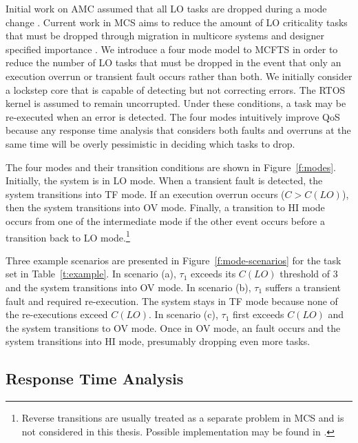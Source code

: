 	Initial work on AMC assumed that all LO tasks are dropped during a mode change \cite{baruah2011response}. 
	Current work in MCS aims to reduce the amount of LO criticality tasks that must be dropped through migration in multicore systems \cite{al2015enhanced} and designer specified importance \cite{fleming2014incorporating}. 
	We introduce a four mode model to MCFTS in order to reduce the number of LO tasks that must be dropped in the event that only an execution overrun or transient fault occurs rather than both. 
	We initially consider a lockstep core that is capable of detecting but not correcting errors.
	The RTOS kernel is assumed to remain uncorrupted.
	Under these conditions, a task may be re-executed when an error is detected.
		The four modes intuitively improve QoS because any response time analysis that considers both faults and overruns at the same time will be overly pessimistic in deciding which tasks to drop.
	
	The four modes and their transition conditions are shown in Figure~\ref{f:modes}. 
	Initially, the system is in LO mode. 
	When a transient fault is detected, the system transitions into TF mode. 
	If an execution overrun occurs ($C>C(LO)$), then the system transitions into OV mode. 
	Finally, a transition to HI mode occurs from one of the intermediate mode if the other event occurs before a transition back to LO mode.\footnote{Reverse transitions are usually treated as a separate problem in MCS and is not considered in this thesis. Possible implementation may be found in \cite{bate2015bailout}.}
	
	Three example scenarios are presented in Figure~\ref{f:mode-scenarios} for the task set in Table~\ref{t:example}. 
	In scenario (a), $\tau_1$ exceeds its $C(LO)$ threshold of 3 and the system transitions into OV mode. In scenario (b), $\tau_1$ suffers a transient fault and required re-execution. The system stays in TF mode because none of the re-executions exceed $C(LO)$. In scenario (c), $\tau_1$ first exceeds $C(LO)$ and the system transitions to OV mode. Once in OV mode, an fault occurs and the system transitions into HI mode, presumably dropping even more tasks.
	

	
	
\subsection{Response Time Analysis}
\label{s:rta}
	
